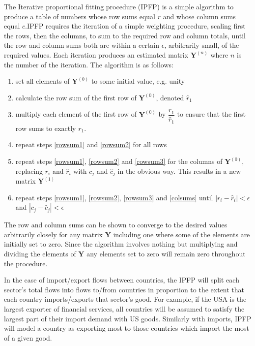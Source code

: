 \documentclass[preprint,authoryear,3p]{elsarticle}
\begin{document}
The Iterative proportional fitting procedure (IPFP) is a simple algorithm to produce a table of numbers whose row sums equal $r$ and whose column sums equal $c$.IPFP requires the iteration of a simple weighting procedure, scaling first the rows, then the columns, to sum to the required row and column totals, until the row and column sums both are within a certain $\epsilon$, arbitrarily small, of the required values. Each iteration produces an estimated matrix $\textbf{Y}^{(n)}$ where $n$ is the number of the iteration. The algorithm is as follows:
\begin{enumerate}
\item set all elements of $\textbf{Y}^{(0)}$ to some initial value, e.g. unity \label{initialise}
\item calculate the row sum of the first row of $\textbf{Y}^{(0)}$, denoted $\hat{r}_1$\label{rowsum1}
\item multiply each element of the first row of $\textbf{Y}^{(0)}$ by $\dfrac{r_1}{\hat{r}_1}$ to ensure that the first row sums to exactly $r_1$. \label{rowsum2}
\item repeat steps \ref{rowsum1} and \ref{rowsum2} for all rows \label{rowsum3}
\item repeat steps \ref{rowsum1}, \ref{rowsum2} and \ref{rowsum3} for the columns of $\textbf{Y}^{(0)}$, replacing $r_i$ and $\hat{r}_i$ with $c_j$ and $\hat{c}_j$ in the obvious way. This results in a new matrix $\textbf{Y}^{(1)}$ \label{colsums}
\item repeat steps \ref{rowsum1}, \ref{rowsum2}, \ref{rowsum3} and \ref{colsums} until $|{r_i - \hat{r}_i}| < \epsilon$ and $|c_j - \hat{c}_j| < \epsilon$
\end{enumerate}
 
The row and column sums can be shown to converge to the desired values arbitrarily closely for any matrix $\textbf{Y}$ including one where some of the elements are initially set to zero. Since the algorithm involves nothing but multiplying and dividing the elements of $\textbf{Y}$ any elements set to zero will remain zero throughout the procedure.

In the case of import/export flows between countries, the IPFP will split each sector's
total flows into flows to/from countries in proportion to the extent that each country imports/exports that sector's good. For example, if the USA is the largest exporter of financial services, all countries will be assumed to satisfy the largest part of their import demand with US goods. Similarly with imports, IPFP will model a country as exporting most to those countries which import the most of a given good.
\end{document}
